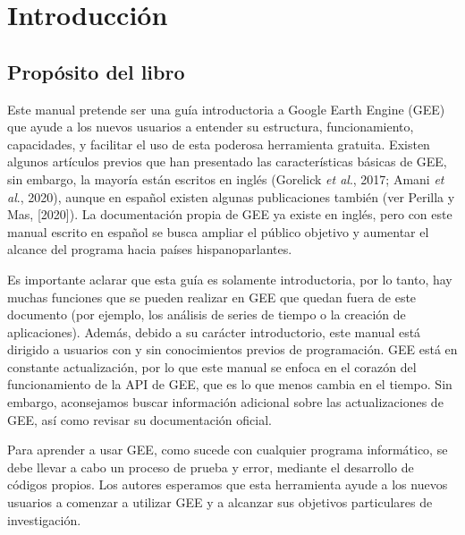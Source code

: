 \documentclass[
  12pt,
  letterpaper,
  twoside]{book}
\renewcommand\headrulewidth{0pt}
\begin{document}
\newpage
\mainmatter

\renewcommand\headrulewidth{1pt}
\pagestyle{fancy} 
 \fancyfoot{}
 \fancyfoot[LE,RO]{\thepage}
 \fancyhead{}
 \fancyhead[LE,RO]{\leftmark}
 \fancyhead[LO,RE]{\rightmark}

\hypertarget{introducciuxf3n}{%
\chapter{Introducción}\label{introducciuxf3n}}

\hypertarget{propuxf3sito-del-libro}{%
\section{Propósito del libro}\label{propuxf3sito-del-libro}}

Este manual pretende ser una guía introductoria a Google Earth Engine (GEE) que ayude a los nuevos usuarios a entender su estructura, funcionamiento, capacidades, y facilitar el uso de esta poderosa herramienta gratuita. Existen algunos artículos previos que han presentado las características básicas de GEE, sin embargo, la mayoría están escritos en inglés (Gorelick \emph{et al}., 2017; Amani \emph{et al}., 2020), aunque en español existen algunas publicaciones también (ver Perilla y Mas, {[}2020{]}). La documentación propia de GEE ya existe en inglés, pero con este manual escrito en español se busca ampliar el público objetivo y aumentar el alcance del programa hacia países hispanoparlantes.

Es importante aclarar que esta guía es solamente introductoria, por lo tanto, hay muchas funciones que se pueden realizar en GEE que quedan fuera de este documento (por ejemplo, los análisis de series de tiempo o la creación de aplicaciones). Además, debido a su carácter introductorio, este manual está dirigido a usuarios con y sin conocimientos previos de programación. GEE está en constante actualización, por lo que este manual se enfoca en el corazón del funcionamiento de la API de GEE, que es lo que menos cambia en el tiempo. Sin embargo, aconsejamos buscar información adicional sobre las actualizaciones de GEE, así como revisar su documentación oficial.

Para aprender a usar GEE, como sucede con cualquier programa informático, se debe llevar a cabo un proceso de prueba y error, mediante el desarrollo de códigos propios. Los autores esperamos que esta herramienta ayude a los nuevos usuarios a comenzar a utilizar GEE y a alcanzar sus objetivos particulares de investigación.
\end{document}

